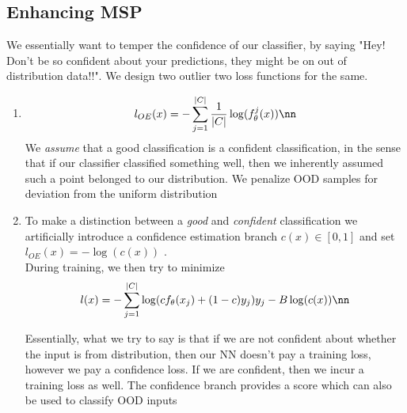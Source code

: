 \documentclass[11pt]{report}
\begin{document}
\subsection{Enhancing MSP}
We essentially want to temper the confidence of our classifier, by saying "Hey! Don't be so confident about your predictions, they might be on out of distribution data!!". We design two outlier two loss functions for the same.
\vspace{1mm}
\begin{enumerate}
    \item \label{mpp:gen_0}
    \begin{align}
        l_{OE}(x)= - \sum_{j=1}^{|C|} \frac{1}{|C|} \log(f_\theta^j(x)) \nn
    \end{align}
    We \emph{assume} that a good classification is a confident classification, in the sense that if our classifier classified something well, then we inherently assumed such a point belonged to our distribution. We penalize OOD samples for deviation from the uniform distribution

    \item \label{mpp:gen_1} To make a distinction between a \emph{good} and \emph{confident} classification we artificially introduce a confidence estimation branch \(c(x) \in [0,1]\) and set \(l_{OE}(x)=-\log(c(x))\) \cite{DeVriesTaylor2018}.\\
    \vspace{1mm}
    During training, we then try to minimize
    \begin{align}
        l(x)= - \sum_{j=1}^{|C|} \log(cf_\theta(x_j)+(1-c)y_j)y_j -B\log(c(x)) \nn
    \end{align}

    Essentially, what we try to say is that if we are not confident about whether the input is from distribution, then our NN doesn't pay a training loss, however we pay a confidence loss. If we are confident, then we incur a training loss as well. The confidence branch provides a score which can also be used to classify OOD inputs
    
\end{enumerate}
\end{document}
